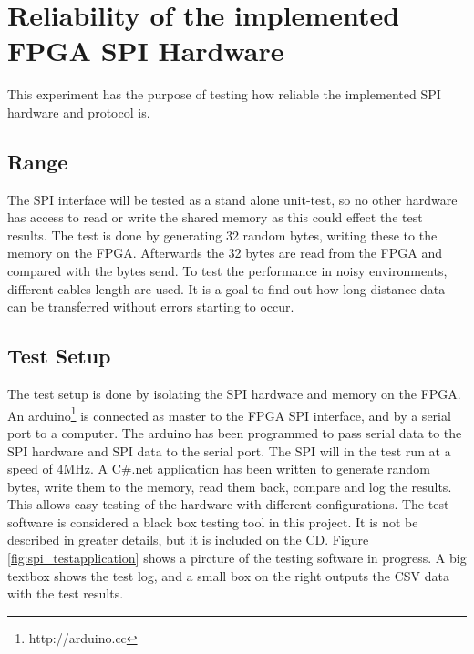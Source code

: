 \section{Reliability of the implemented FPGA SPI Hardware}
\label{sec:spi_rel_test}
This experiment has the purpose of testing how reliable the implemented SPI hardware and protocol is. 

\subsection{Range}	%
The SPI interface will be tested as a stand alone unit-test, so no other hardware has access to read or write the shared memory as this could effect the test results. The test is done by generating 32 random bytes, writing these to the memory on the FPGA. Afterwards the 32 bytes are read from the FPGA and compared with the bytes send. To test the performance in noisy environments, different cables length are used. It is a goal to find out how long distance data can be transferred without errors starting to occur.


\subsection{Test Setup}
The test setup is done by isolating the SPI hardware and memory on the FPGA. An arduino\footnote{http://arduino.cc} is connected as master to the FPGA SPI interface, and by a serial port to a computer. The arduino has been programmed to pass serial data to the SPI hardware and SPI data to the serial port. The SPI will in the test run at a speed of 4MHz. A C\#.net application has been written to generate random bytes, write them to the memory, read them back, compare and log the results. This allows easy testing of the hardware with different configurations. The test software is considered a black box testing tool in this project. It is not be described in greater details, but it is included on the CD. Figure \ref{fig:spi_testapplication} shows a pircture of the testing software in progress. A big textbox shows the test log, and a small box on the right outputs the CSV data with the test results.

